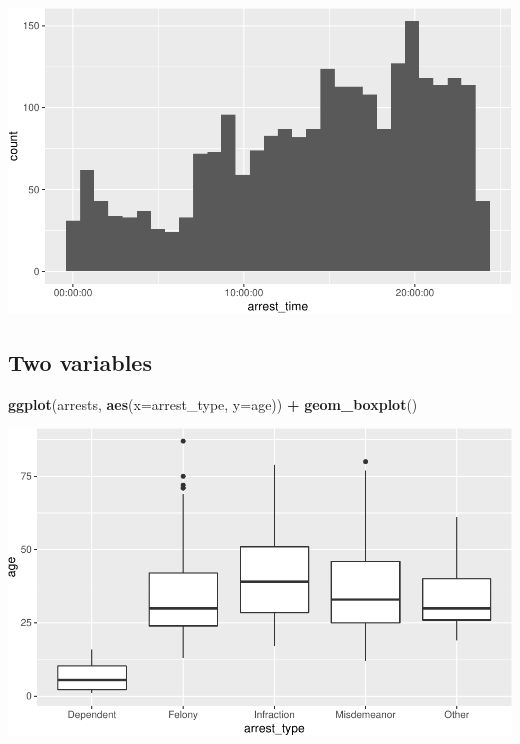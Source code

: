 \documentclass[]{book}
\newenvironment{Shaded}{\begin{snugshade}}{\end{snugshade}}
\newcommand{\DataTypeTok}[1]{\textcolor[rgb]{0.13,0.29,0.53}{#1}}
\newcommand{\KeywordTok}[1]{\textcolor[rgb]{0.13,0.29,0.53}{\textbf{#1}}}
\newcommand{\NormalTok}[1]{#1}
\newcommand{\OperatorTok}[1]{\textcolor[rgb]{0.81,0.36,0.00}{\textbf{#1}}}
\newcommand{\StringTok}[1]{\textcolor[rgb]{0.31,0.60,0.02}{#1}}
\begin{document}
\begin{center}\includegraphics[width=\textwidth]{afam-188r_files/figure-latex/unnamed-chunk-10-1} \end{center}

\hypertarget{two-variables}{%
\subsection{Two variables}\label{two-variables}}

\begin{Shaded}
\begin{Highlighting}[]
\KeywordTok{ggplot}\NormalTok{(arrests, }\KeywordTok{aes}\NormalTok{(}\DataTypeTok{x=}\NormalTok{arrest_type, }\DataTypeTok{y=}\NormalTok{age)) }\OperatorTok{+}\StringTok{ }\KeywordTok{geom_boxplot}\NormalTok{()}
\end{Highlighting}
\end{Shaded}

\begin{center}\includegraphics[width=\textwidth]{afam-188r_files/figure-latex/unnamed-chunk-11-1} \end{center}
\end{document}
